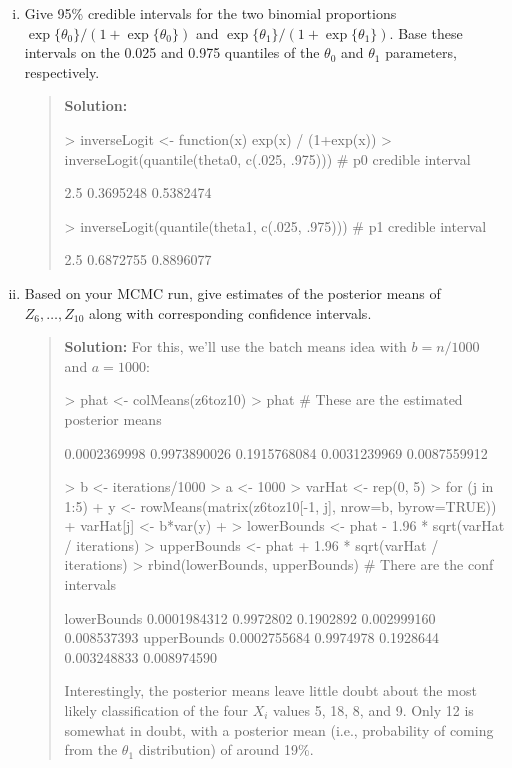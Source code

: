 \documentclass{article}
\begin{document}
\begin{enumerate}[(i)]
\item 
Give 95\% credible intervals for the two binomial 
proportions $\exp\{\theta_0\} / (1+\exp\{\theta_0\})$ and
$\exp\{\theta_1\} / (1+\exp\{\theta_1\})$.  Base these intervals
on the 0.025 and 0.975 quantiles of the $\theta_0$ and $\theta_1$
parameters, respectively.
\begin{quotation}{\bf Solution:}
\begin{Schunk}
\begin{Sinput}
> inverseLogit <- function(x) exp(x) / (1+exp(x))
> inverseLogit(quantile(theta0, c(.025, .975))) # p0 credible interval
\end{Sinput}
\begin{Soutput}
     2.5%
0.3695248 0.5382474 
\end{Soutput}
\begin{Sinput}
> inverseLogit(quantile(theta1, c(.025, .975))) # p1 credible interval
\end{Sinput}
\begin{Soutput}
     2.5%
0.6872755 0.8896077 
\end{Soutput}
\end{Schunk}
\end{quotation}

\item 
Based on your MCMC run, give estimates of the 
posterior means of $Z_6, \ldots, Z_{10}$ along with 
corresponding confidence intervals.
\begin{quotation}{\bf Solution:}
For this, we'll use the batch means idea with $b=n/1000$ and $a=1000$:
\begin{Schunk}
\begin{Sinput}
> phat <- colMeans(z6toz10)
> phat # These are the estimated posterior means
\end{Sinput}
\begin{Soutput}
[1] 0.0002369998 0.9973890026 0.1915768084 0.0031239969 0.0087559912
\end{Soutput}
\begin{Sinput}
> b <- iterations/1000
> a <- 1000
> varHat <- rep(0, 5)
> for (j in 1:5) {
+   y <- rowMeans(matrix(z6toz10[-1, j], nrow=b, byrow=TRUE))
+   varHat[j] <- b*var(y)
+ }
> lowerBounds <- phat - 1.96 * sqrt(varHat / iterations)
> upperBounds <- phat + 1.96 * sqrt(varHat / iterations)
> rbind(lowerBounds, upperBounds) # There are the conf intervals
\end{Sinput}
\begin{Soutput}
                    [,1]      [,2]      [,3]        [,4]        [,5]
lowerBounds 0.0001984312 0.9972802 0.1902892 0.002999160 0.008537393
upperBounds 0.0002755684 0.9974978 0.1928644 0.003248833 0.008974590
\end{Soutput}
\end{Schunk}

Interestingly, the posterior means leave little doubt about the
most likely classification of the four $X_i$ values 5, 18, 8, and 9.
Only 12 is somewhat in doubt, with a posterior mean 
(i.e., probability of coming from the $\theta_1$ distribution)
of around 19\%.
\end{quotation}

\end{enumerate}
\end{document}
